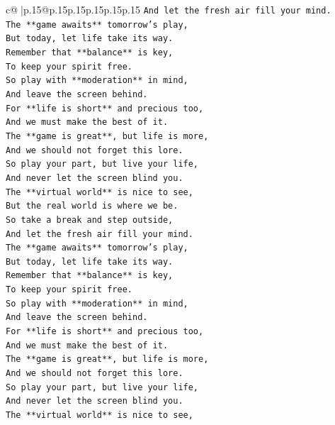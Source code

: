 \documentclass{article}
\begin{document}
{\begin{supertabular}{c@{$\;$}|p{.15\linewidth}@{}p{.15\linewidth}p{.15\linewidth}p{.15\linewidth}p{.15\linewidth}p{.15\linewidth}}
{{{\texttt{And let the fresh air fill your mind.} \\
\texttt{The **game awaits** tomorrow's play,} \\
\texttt{But today, let life take its way.} \\
\texttt{Remember that **balance** is key,} \\
\texttt{To keep your spirit free.} \\
\texttt{So play with **moderation** in mind,} \\
\texttt{And leave the screen behind.} \\
\texttt{For **life is short** and precious too,} \\
\texttt{And we must make the best of it.} \\
\texttt{The **game is great**, but life is more,} \\
\texttt{And we should not forget this lore.} \\
\texttt{So play your part, but live your life,} \\
\texttt{And never let the screen blind you.} \\
\texttt{The **virtual world** is nice to see,} \\
\texttt{But the real world is where we be.} \\
\texttt{So take a break and step outside,} \\
\texttt{And let the fresh air fill your mind.} \\
\texttt{The **game awaits** tomorrow's play,} \\
\texttt{But today, let life take its way.} \\
\texttt{Remember that **balance** is key,} \\
\texttt{To keep your spirit free.} \\
\texttt{So play with **moderation** in mind,} \\
\texttt{And leave the screen behind.} \\
\texttt{For **life is short** and precious too,} \\
\texttt{And we must make the best of it.} \\
\texttt{The **game is great**, but life is more,} \\
\texttt{And we should not forget this lore.} \\
\texttt{So play your part, but live your life,} \\
\texttt{And never let the screen blind you.} \\
\texttt{The **virtual world** is nice to see,} \\
}}}
\end{supertabular}}
\end{document}

